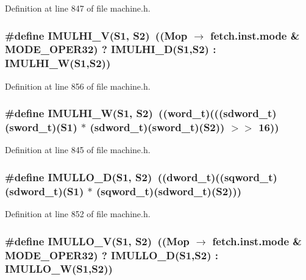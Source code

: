 Definition at line 847 of file machine.h.
\subsubsection[{IMULHI\_\-V}]{\setlength{\rightskip}{0pt plus 5cm}\#define IMULHI\_\-V(S1, \/  S2)~((Mop $\rightarrow$ fetch.inst.mode \& MODE\_\-OPER32) ? IMULHI\_\-D(S1,S2) : IMULHI\_\-W(S1,S2))}\label{machine_8h_02131364ab6e60b0ae3a73b506dda4de}




Definition at line 856 of file machine.h.
\subsubsection[{IMULHI\_\-W}]{\setlength{\rightskip}{0pt plus 5cm}\#define IMULHI\_\-W(S1, \/  S2)~(({\bf word\_\-t})((({\bf sdword\_\-t})({\bf sword\_\-t})(S1) $\ast$ ({\bf sdword\_\-t})({\bf sword\_\-t})(S2)) $>$$>$ 16))}\label{machine_8h_195165743d52a06b62fe72fba7bef515}




Definition at line 845 of file machine.h.
\subsubsection[{IMULLO\_\-D}]{\setlength{\rightskip}{0pt plus 5cm}\#define IMULLO\_\-D(S1, \/  S2)~(({\bf dword\_\-t})((sqword\_\-t)({\bf sdword\_\-t})(S1) $\ast$ (sqword\_\-t)({\bf sdword\_\-t})(S2)))}\label{machine_8h_acf86e136405c5dc806c1d98eeef9944}




Definition at line 852 of file machine.h.
\subsubsection[{IMULLO\_\-V}]{\setlength{\rightskip}{0pt plus 5cm}\#define IMULLO\_\-V(S1, \/  S2)~((Mop $\rightarrow$ fetch.inst.mode \& MODE\_\-OPER32) ? IMULLO\_\-D(S1,S2) : IMULLO\_\-W(S1,S2))}\label{machine_8h_111e566df8acda5d7c1ca8f65e4969fb}




